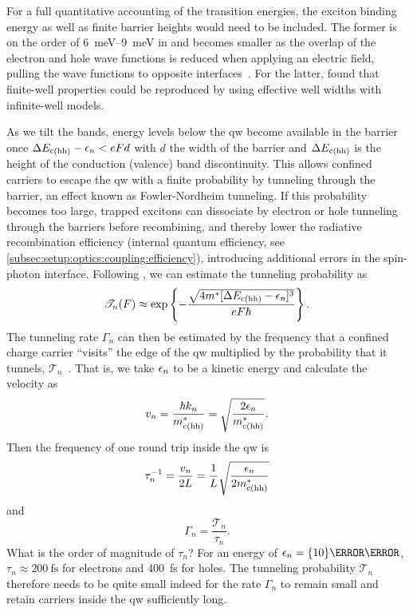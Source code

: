 For a full quantitative accounting of the transition energies, the exciton binding energy as well as finite barrier heights would need to be included.
The former is on the order of \qtyrange{6}{9}{\milli\electronvolt} in  and becomes smaller as the overlap of the electron and hole wave functions is reduced when applying an electric field, pulling the wave functions to opposite interfaces~\cite{Miller1984}.
For the latter, \textcite{Miller1985} found that finite-well properties could be reproduced by using effective well widths with infinite-well models.

As we tilt the bands, energy levels below the \gls{qw} become available in the barrier once $\Delta E_{\mathrm{c}(\mathrm{hh})} - \epsilon_{n} < eFd$ with $d$ the width of the barrier and $\Delta E_{\mathrm{c}(\mathrm{hh})}$ is the height of the conduction (valence) band discontinuity.
This allows confined carriers to escape the \gls{qw} with a finite probability by tunneling through the barrier, an effect known as Fowler-Nordheim tunneling.
If this probability becomes too large, trapped excitons can dissociate by electron or hole tunneling through the barriers before recombining, and thereby lower the radiative recombination efficiency (internal quantum efficiency, see \cref{subsec:setup:optics:coupling:efficiency}), introducing additional errors in the spin-photon interface.
Following , we can estimate the tunneling probability as
\begin{equation}\label{eq:exp:theory:qcse:tunneling:probability}
    \mathscr{T}_n(F) \approx \exp\left\lbrace -\frac{\sqrt{4 m^\ast [\Delta E_{\mathrm{c}(\mathrm{hh})} - \epsilon_n]^3}}{e F\hbar}\right\rbrace.
\end{equation}
The tunneling rate $\Gamma_n$ can then be estimated by the frequency that a confined charge carrier \enquote{visits} the edge of the \gls{qw} multiplied by the probability that it tunnels, $\mathscr{T}_n$~\cite{Larsson1988}.
That is, we take $\epsilon_n$ to be a kinetic energy and calculate the velocity as
\begin{equation}
    v_n = \frac{\hbar k_n}{m^\ast_{\mathrm{c}(\mathrm{hh})}} = \sqrt{\frac{2 \epsilon_n}{m^\ast_{\mathrm{c}(\mathrm{hh})}}}.
\end{equation}
Then the frequency of one round trip inside the \gls{qw} is
\begin{equation}
    \tau_n^{-1} = \frac{v_n}{2L} = \frac{1}{L}\sqrt{\frac{\epsilon_n}{2 m^\ast_{\mathrm{c}(\mathrm{hh})}}}
\end{equation}
and
\begin{equation}\label{eq:exp:theory:qcse:tunneling:rate}
    \Gamma_n = \frac{\mathscr{T}_n}{\tau_n}.
\end{equation}
What is the order of magnitude of $\tau_n$?
For an energy of $\eps_n = \qty{10}{\milli\electronvolt}$, $\tau_n\approx\qty{200}{\femto\second}$ for electrons and \qty{400}{\femto\second} for holes.
The tunneling probability $\mathscr{T}_n$ therefore needs to be quite small indeed for the rate $\Gamma_n$ to remain small and retain carriers inside the \gls{qw} sufficiently long.

